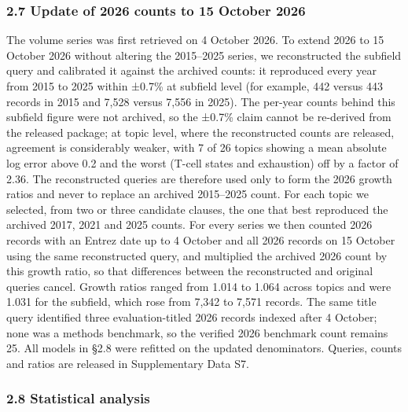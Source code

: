 \documentclass[11pt]{article}
\begin{document}
\subsubsection{2.7 Update of 2026 counts to 15 October
2026}\label{update-of-2026-counts-to-15-october-2026}

The volume series was first retrieved on 4 October 2026. To extend 2026
to 15 October 2026 without altering the 2015--2025 series, we
reconstructed the subfield query and calibrated it against the archived
counts: it reproduced every year from 2015 to 2025 within ±0.7\% at
subfield level (for example, 442 versus 443 records in 2015 and 7,528
versus 7,556 in 2025). The per-year counts behind this subfield figure
were not archived, so the ±0.7\% claim cannot be re-derived from the
released package; at topic level, where the reconstructed counts are
released, agreement is considerably weaker, with 7 of 26 topics showing
a mean absolute log error above 0.2 and the worst (T-cell states and
exhaustion) off by a factor of 2.36. The reconstructed queries are
therefore used only to form the 2026 growth ratios and never to replace
an archived 2015--2025 count. For each topic we selected, from two or
three candidate clauses, the one that best reproduced the archived 2017,
2021 and 2025 counts. For every series we then counted 2026 records with
an Entrez date up to 4 October and all 2026 records on 15 October using
the same reconstructed query, and multiplied the archived 2026 count by
this growth ratio, so that differences between the reconstructed and
original queries cancel. Growth ratios ranged from 1.014 to 1.064 across
topics and were 1.031 for the subfield, which rose from 7,342 to 7,571
records. The same title query identified three evaluation-titled 2026
records indexed after 4 October; none was a methods benchmark, so the
verified 2026 benchmark count remains 25. All models in §2.8 were
refitted on the updated denominators. Queries, counts and ratios are
released in Supplementary Data S7.

\subsubsection{2.8 Statistical analysis}\label{statistical-analysis}
\end{document}

